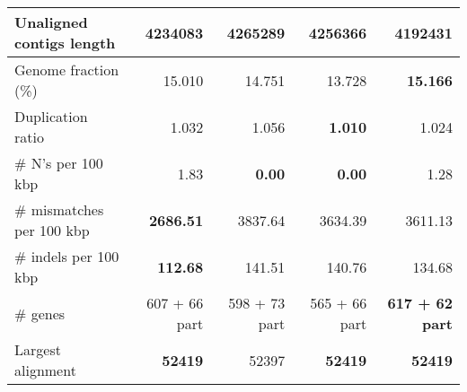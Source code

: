 \documentclass[12pt,a4paper]{article}
\begin{document}
\begin{table}[ht]
\begin{center}
\begin{tabular}{|l*{4}{|r}|}
Unaligned contigs length & 4234083 & 4265289 & 4256366 & {\bf 4192431} \\ \hline
Genome fraction (\%) & 15.010 & 14.751 & 13.728 & {\bf 15.166} \\ \hline
Duplication ratio & 1.032 & 1.056 & {\bf 1.010} & 1.024 \\ \hline
\# N's per 100 kbp & 1.83 & {\bf 0.00} & {\bf 0.00} & 1.28 \\ \hline
\# mismatches per 100 kbp & {\bf 2686.51} & 3837.64 & 3634.39 & 3611.13 \\ \hline
\# indels per 100 kbp & {\bf 112.68} & 141.51 & 140.76 & 134.68 \\ \hline
\# genes & 607 + 66 part & 598 + 73 part & 565 + 66 part & {\bf 617 + 62 part} \\ \hline
Largest alignment & {\bf 52419} & 52397 & {\bf 52419} & {\bf 52419} \\ \hline
\end{tabular}
\end{center}
\end{table}
\end{document}
